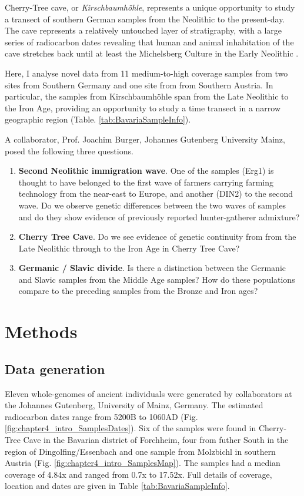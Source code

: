 Cherry-Tree cave, or \textit{Kirschbaumhöhle}, represents a unique opportunity to study a transect of southern German samples from the Neolithic to the present-day. The cave represents a relatively untouched layer of stratigraphy, with a large series of radiocarbon dates revealing that human and animal inhabitation of the cave stretches back until at least the Michelsberg Culture in the Early Neolithic \cite{botigue2017ancient}. 

Here, I analyse novel data from 11 medium-to-high coverage samples from two sites from Southern Germany and one site from from Southern Austria. In particular, the samples from Kirschbaumhöhle span from the Late Neolithic to the Iron Age, providing an opportunity to study a time transect in a narrow geographic region (Table. \ref{tab:BavariaSampleInfo}). 

A collaborator, Prof. Joachim Burger, Johannes Gutenberg University Mainz, posed the following three questions. 

\begin{enumerate}
\item \textbf{Second Neolithic immigration wave}. One of the samples (Erg1) is thought to have belonged to the first wave of farmers carrying farming technology from the near-east to Europe, and another (DIN2) to the second wave. Do we observe genetic differences between the two waves of samples and do they show evidence of previously reported hunter-gatherer admixture?
\item \textbf{Cherry Tree Cave}. Do we see evidence of genetic continuity from from the Late Neolithic through to the Iron Age in Cherry Tree Cave?
\item \textbf{Germanic / Slavic divide}. Is there a distinction between the Germanic and Slavic samples from the Middle Age samples? How do these populations compare to the preceding samples from the Bronze and Iron ages?
\end{enumerate}

\section{Methods}

\subsection{Data generation}

Eleven whole-genomes of ancient individuals were generated by collaborators at the Johannes Gutenberg, University of Mainz, Germany. The estimated radiocarbon dates range from 5200B to 1060AD (Fig. \ref{fig:chapter4_intro_SamplesDates}). Six of the samples were found in Cherry-Tree Cave in the Bavarian district of Forchheim, four from futher South in the region of Dingolfing/Essenbach and one sample from Molzbichl in southern Austria (Fig. \ref{fig:chapter4_intro_SamplesMap}). The samples had a median coverage of 4.84x and ranged from 0.7x to 17.52x. Full details of coverage, location and dates are given in Table \ref{tab:BavariaSampleInfo}.

